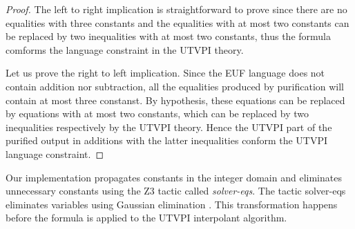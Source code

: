 \begin{proof}
  The left to right implication is straightforward to prove 
  since there are no equalities with three constants and 
  the equalities with at most two constants can be replaced
  by two inequalities with at most two constants, thus the formula
  comforms the language constraint in the UTVPI theory.

  Let us prove the right to left implication. 
  Since the EUF language does not contain addition nor subtraction,
  all the equalities produced by purification will contain at most
  three constanst. By hypothesis, these equations can be replaced
  by equations with at most two constants, which can be replaced
  by two inequalities respectively by the UTVPI theory.
  Hence the UTVPI part of the purified output
  in additions with the latter inequalities conform the UTVPI
  language constraint.
\end{proof}

Our implementation propagates constants in the integer domain 
and eliminates unnecessary constants using the Z3 tactic
called \emph{solver-eqs}. The tactic solver-eqs eliminates 
variables using Gaussian elimination \cite{z3-strategies}.
This transformation happens before the formula is applied to
the UTVPI interpolant algorithm.

